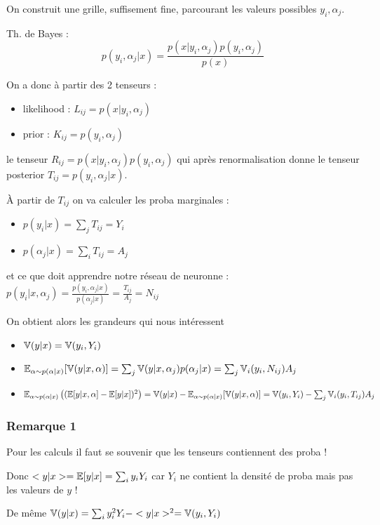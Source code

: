 On construit une grille, suffisement fine, parcourant les valeurs possibles $y_i, \alpha_j$.

Th. de Bayes : 
$$
    p(y_i, \alpha_j | x) = \frac{p(x|y_i, \alpha_j) p(y_i, \alpha_j)}{p(x)}
$$

On a donc à partir des 2 tenseurs : 
\begin{itemize}
	\item likelihood : $L_{ij} = p(x|y_i, \alpha_j)$
	\item prior : $K_{ij} = p(y_i, \alpha_j)$ 
\end{itemize}

le tenseur $ R_{ij} = p(x|y_i, \alpha_j) p(y_i, \alpha_j) $ 
qui après renormalisation donne le tenseur posterior $ T_{ij} = p(y_i, \alpha_j | x)$.

À partir de $T_{ij}$ on va calculer les proba marginales :
\begin{itemize}
	\item $p(y_i | x) = \sum_j T_{ij} = Y_i$
	\item $p(\alpha_j | x) = \sum_i T_{ij} = A_j$
\end{itemize}

et ce que doit apprendre notre réseau de neuronne : $p(y_i | x, \alpha_j) = \frac{p(y_i, \alpha_j | x)}{p(\alpha_j | x)} = \frac{T_{ij}}{A_j} = N_{ij}$

On obtient alors les grandeurs qui nous intéressent
\begin{itemize}
	\item $ \mathbb{V}(y|x) = \mathbb{V}(y_i, Y_i) $
	\item $ \mathbb{E}_{\alpha \sim p(\alpha|x)}[ \mathbb{V}(y|x, \alpha) ] = \sum_j \mathbb{V}(y|x, \alpha_j) p(\alpha_j | x) = \sum_j \mathbb{V}_i(y_i, N_{ij}) A_j$
	\item $\mathbb{E}_{\alpha \sim p(\alpha|x)} \left ((\mathbb{E} [y|x, \alpha]  - \mathbb{E}[y|x])^2\right ) = \mathbb{V}(y|x) - \mathbb{E}_{\alpha \sim p(\alpha|x)}[ \mathbb{V}(y|x, \alpha) ] = \mathbb{V}(y_i, Y_i) - \sum_j \mathbb{V}_i(y_i, T_{ij}) A_j$
\end{itemize}

\subsubsection{Remarque 1}

Pour les calculs il faut se souvenir que les tenseurs contiennent des proba !

Donc $<y|x>= \mathbb{E}[y|x] = \sum_i y_i Y_i$ car $Y_i$ ne contient la densité de proba mais pas les valeurs de $y$ !

De même $\mathbb{V}(y|x) = \sum_i y_i^2 Y_i - <y|x>^2 = \mathbb{V}(y_i, Y_i)$

